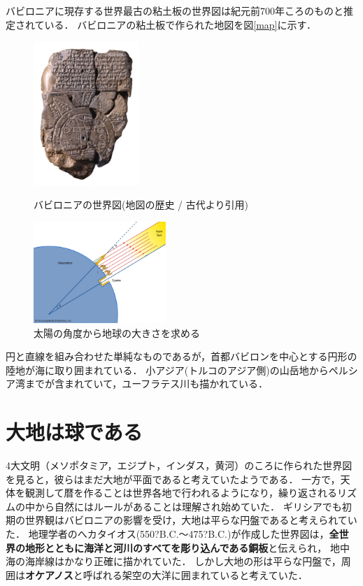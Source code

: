 \documentclass[titlepage]{jarticle}
\begin{document}
バビロニアに現存する世界最古の粘土板の世界図は紀元前700年ころのものと推定されている．
バビロニアの粘土板で作られた地図を図\ref{map}に示す．
\begin{figure}[t]
      \centering
      \begin{minipage}[]{0.45\hsize}
            \centering
            \includegraphics[width=4cm]{img/babironia.jpg}
            \caption{バビロニアの世界図(地図の歴史 / 古代より引用)}
            \label{map}
      \end{minipage}
      \begin{minipage}[]{0.45\hsize}
            \centering
            \includegraphics[width=5cm]{img/hidokei.jpeg}
            \caption{太陽の角度から地球の大きさを求める}
            \label{hidokeii}
      \end{minipage}
\end{figure}
円と直線を組み合わせた単純なものであるが，首都バビロンを中心とする円形の陸地が海に取り囲まれている．
小アジア(トルコのアジア側)の山岳地からペルシア湾までが含まれていて，ユーフラテス川も描かれている．

\section{大地は球である}
4大文明（メソポタミア，エジプト，インダス，黄河）のころに作られた世界図を見ると，彼らはまだ大地が平面であると考えていたようである．
一方で，天体を観測して暦を作ることは世界各地で行われるようになり，繰り返されるリズムの中から自然にはルールがあることは理解され始めていた．
ギリシアでも初期の世界観はバビロニアの影響を受け，大地は平らな円盤であると考えられていた．
地理学者のへカタイオス(550?B.C.～475?B.C.)が作成した世界図は，\textbf{全世界の地形とともに海洋と河川のすべてを彫り込んである銅板}と伝えられ，
地中海の海岸線はかなり正確に描かれていた．
しかし大地の形は平らな円盤で，周囲は\textbf{オケアノス}と呼ばれる架空の大洋に囲まれていると考えていた．
\end{document}
